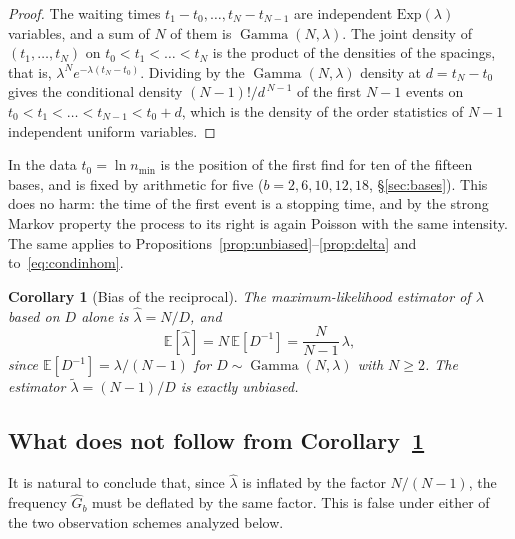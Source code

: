 \documentclass[11pt,a4paper]{article}
\theoremstyle{plain}
\newtheorem{corollary}{Corollary}
\theoremstyle{remark}
\DeclareMathOperator{\Gam}{Gamma}
\begin{document}
\begin{proof}
The waiting times $t_1-t_0,\dots,t_N-t_{N-1}$ are independent
$\mathrm{Exp}(\lambda)$ variables, and a sum of $N$ of them is
$\Gam(N,\lambda)$. The joint density of $(t_1,\dots,t_N)$ on
$t_0<t_1<\dots<t_N$ is the product of the densities of the spacings, that is,
$\lambda^Ne^{-\lambda(t_N-t_0)}$. Dividing by the $\Gam(N,\lambda)$ density at
$d=t_N-t_0$ gives the conditional density $(N-1)!/d^{\,N-1}$ of the first $N-1$
events on $t_0<t_1<\dots<t_{N-1}<t_0+d$, which is the density of the order
statistics of $N-1$ independent uniform variables.
\end{proof}

\noindent In the data $t_0=\ln n_{\min}$ is the position of the first find for
ten of the fifteen bases, and is fixed by arithmetic for five ($b=2,6,10,12,18$,
\S\ref{sec:bases}). This does no harm: the time of the first event is a stopping
time, and by the strong Markov property the process to its right is again Poisson
with the same intensity. The same applies to
Propositions~\ref{prop:unbiased}--\ref{prop:delta} and to~\eqref{eq:condinhom}.

\begin{corollary}[Bias of the reciprocal]\label{cor:kappa}
The maximum-likelihood estimator of $\lambda$ based on $D$ alone is
$\hat\lambda=N/D$, and
\begin{equation}\label{eq:bias}
\mathbb E[\hat\lambda]=N\,\mathbb E[D^{-1}]=\frac{N}{N-1}\,\lambda,
\end{equation}
since $\mathbb E[D^{-1}]=\lambda/(N-1)$ for $D\sim\Gam(N,\lambda)$ with $N\ge2$.
The estimator $\tilde\lambda=(N-1)/D$ is exactly unbiased.
\end{corollary}

\subsection{What does not follow from Corollary~\ref{cor:kappa}}

It is natural to conclude that, since $\hat\lambda$ is inflated by the factor
$N/(N-1)$, the frequency $\hat G_b$ must be deflated by the same factor. This is
false under either of the two observation schemes analyzed below.
\end{document}
